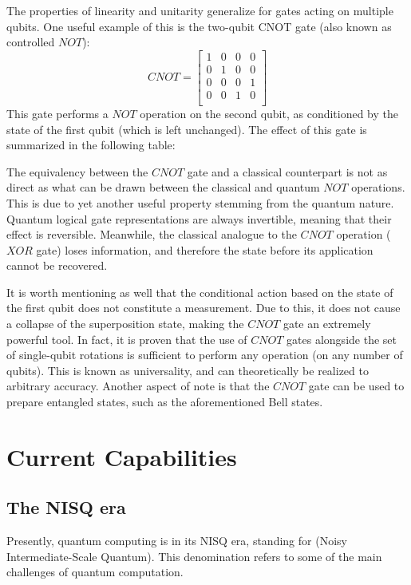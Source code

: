 The properties of linearity and unitarity generalize for gates acting on multiple qubits. One useful example of this is the two-qubit CNOT gate (also known as controlled $NOT$):
\begin{equation}
    CNOT=\begin{bmatrix}
        1&0&0&0\\
        0&1&0&0\\		 		
        0&0&0&1\\
        0&0&1&0\\
    \end{bmatrix}
\end{equation}
This gate performs a $NOT$ operation on the second qubit, as conditioned by the state of the first qubit (which is left unchanged). The effect of this gate is summarized in the following table:

\FloatBarrier

The equivalency between the $CNOT$ gate and a classical counterpart is not as direct as what can be drawn between the classical and quantum $NOT$ operations. This is due to yet another useful property stemming from the quantum nature. Quantum logical gate representations are always invertible, meaning that their effect is reversible. Meanwhile, the classical analogue to the $CNOT$ operation ($XOR$ gate) loses information, and therefore the state before its application cannot be recovered.

 It is worth mentioning as well that the conditional action based on the state of the first qubit does not constitute a measurement. Due to this, it does not cause a collapse of the superposition state, making the $CNOT$ gate an extremely powerful tool. In fact, it is proven that the use of $CNOT$ gates alongside the set of single-qubit rotations is sufficient to perform any operation (on any number of qubits). This is known as universality, and can theoretically be realized to arbitrary accuracy.
 Another aspect of note is that the $CNOT$ gate can be used to prepare entangled states, such as the aforementioned Bell states.

\section{Current Capabilities}

\subsection{The NISQ era}
Presently, quantum computing is in its NISQ era, standing for (Noisy Intermediate-Scale Quantum). This denomination refers to some of the main challenges of quantum computation. 

